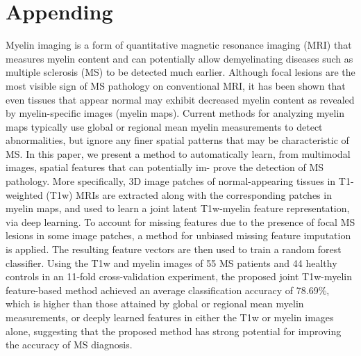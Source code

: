 \appendix

\section{Appending}

Myelin imaging is a form of quantitative magnetic resonance
imaging (MRI) that measures myelin content and can potentially allow
demyelinating diseases such as multiple sclerosis (MS) to be detected
much earlier. Although focal lesions are the most visible sign of MS
pathology on conventional MRI, it has been shown that even tissues
that appear normal may exhibit decreased myelin content as revealed
by myelin-specific images (myelin maps). Current methods for analyzing
myelin maps typically use global or regional mean myelin measurements
to detect abnormalities, but ignore any finer spatial patterns that may be
characteristic of MS. In this paper, we present a method to automatically
learn, from multimodal images, spatial features that can potentially im-
prove the detection of MS pathology. More specifically, 3D image patches
of normal-appearing tissues in T1-weighted (T1w) MRIs are extracted
along with the corresponding patches in myelin maps, and used to learn
a joint latent T1w-myelin feature representation, via deep learning. To
account for missing features due to the presence of focal MS lesions in
some image patches, a method for unbiased missing feature imputation
is applied. The resulting feature vectors are then used to train a random
forest classifier. Using the T1w and myelin images of 55 MS patients
and 44 healthy controls in an 11-fold cross-validation experiment, the
proposed joint T1w-myelin feature-based method achieved an average
classification accuracy of 78.69\%, which is higher than those attained by
global or regional mean myelin measurements, or deeply learned features
in either the T1w or myelin images alone, suggesting that the proposed
method has strong potential for improving the accuracy of MS diagnosis.


